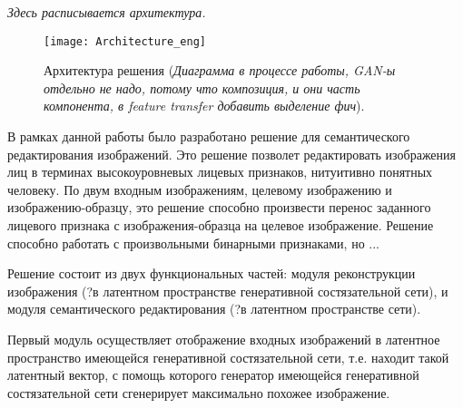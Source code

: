 \emph{Здесь расписывается архитектура.}


\begin{figure}[h]
\begin{center}
    \texttt{[image: Architecture\_eng]}
    \caption{Архитектура решения (\emph{Диаграмма в процессе работы, GAN-ы отдельно не надо, потому что композиция, и они часть компонента, в feature transfer добавить выделение фич}).}
    \label{fig:architecture}
\end{center}
\end{figure}

В рамках данной работы было разработано решение для семантического редактирования изображений. Это решение позволет редактировать изображения лиц в терминах высокоуровневых лицевых признаков, нитуитивно понятных человеку. %
По двум входным изображениям, целевому изображению и изображению-образцу, это решение способно произвести перенос заданного лицевого признака с изображения-образца на целевое изображение.
Решение способно работать с произвольными бинарными признаками, но ...

Решение состоит из двух функциональных частей: модуля реконструкции изображения (?в латентном пространстве генеративной состязательной сети), и модуля семантического редактирования (?в латентном пространстве сети).

Первый модуль осуществляет отображение входных изображений в латентное пространство имеющейся генеративной состязательной сети, т.е. находит такой латентный вектор, с помощь которого генератор имеющейся генеративной состязательной сети сгенерирует максимально похожее изображение.

